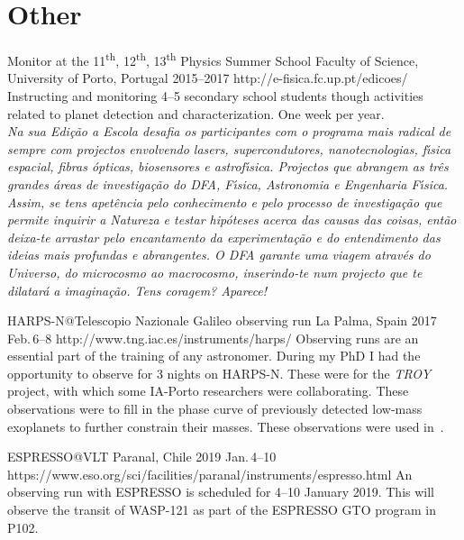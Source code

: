 \section{Other}\label{app_sec:other}

{Monitor at the 11\textsuperscript{th}, 12\textsuperscript{th}, 13\textsuperscript{th} Physics Summer School}
{Faculty of Science, University of Porto, Portugal}%
{2015--2017}%
{http://e-fisica.fc.up.pt/edicoes/}%
{}%
{Instructing and monitoring 4--5 secondary school students though activities related to planet detection and characterization.
One week per year.\\
  \emph{Na sua Edi\c{c}\~{a}o a Escola desafia os participantes com o programa mais radical de sempre com projectos envolvendo lasers, supercondutores, nanotecnologias, f\'{\i}sica espacial, fibras \'{o}pticas, biosensores e astrof\'{\i}sica.
      Projectos que abrangem as tr\^{e}s grandes áreas de investiga\c{c}\~{a}o do DFA, F\'{\i}sica, Astronomia e Engenharia F\'{\i}sica.
      Assim, se tens apet\^{e}ncia pelo conhecimento e pelo processo de investiga\c{c}\~{a}o que permite inquirir a Natureza e testar hip\'{o}teses acerca das causas das coisas, ent\~{a}o deixa-te arrastar pelo encantamento da experimenta\c{c}\~{a}o e do entendimento das ideias mais profundas e abrangentes.
      O DFA garante uma viagem através do Universo, do microcosmo ao macrocosmo, inserindo-te num projecto que te dilatar\'{a} a imagina\c{c}\~{a}o.
Tens coragem? Aparece!}}%


{HARPS-N@Telescopio Nazionale Galileo observing run}
{La Palma, Spain}%
{2017 Feb.\,6--8}%
{http://www.tng.iac.es/instruments/harps/}%
{}%
{Observing runs are an essential part of the training of any astronomer.
    During my PhD I had the opportunity to observe for 3 nights on {HARPS-N}.
    These were for the \emph{TROY} project, with which some IA-Porto researchers were collaborating.
    These observations were to fill in the phase curve of previously detected low-mass exoplanets to further constrain their masses.
    These observations were used in~\citet{lillo-box_troy_2018}.
}%


{ESPRESSO@VLT}
{Paranal, Chile} %
{2019 Jan.\,4--10} %
{https://www.eso.org/sci/facilities/paranal/instruments/espresso.html} %
{} %
{An observing run with ESPRESSO is scheduled for 4--10 January 2019.
This will observe the transit of WASP-121 as part of the ESPRESSO GTO program in P102.}
